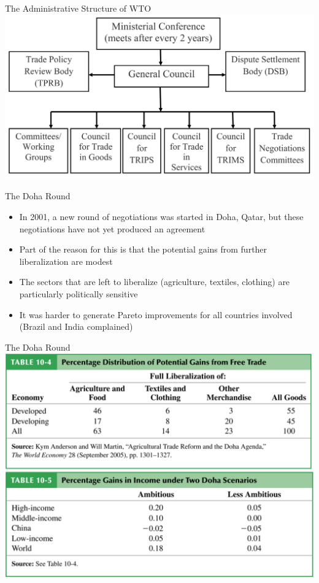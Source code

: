 \documentclass[10pt,hyperref={CJKbookmarks=true},xcolor=dvipsnames,aspectratio=169]{beamer}
\begin{document}
\begin{frame}{The Administrative Structure of WTO}
\centering \includegraphics[scale=0.08]{fig/politic/wto2}
\end{frame}

\begin{frame}{The Doha Round}
	\begin{itemize}
		\item 	In 2001, a new round of negotiations was started in
		Doha, Qatar, but these negotiations have not yet
		produced an agreement
		\item Part of the reason for this is that the potential gains
		from further liberalization are modest
		\item  The sectors that are left to liberalize (agriculture,
		textiles, clothing) are particularly politically sensitive
		\item It was harder to generate Pareto improvements for all
		countries involved (Brazil and India complained)
	\end{itemize}
\end{frame}

\begin{frame}{The Doha Round}
\centering \includegraphics[scale=0.3]{fig/politic/doha1}
\end{frame}
\end{document}
